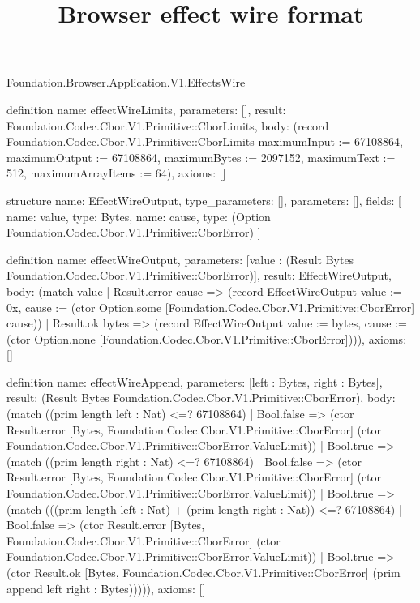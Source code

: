 \begin{lexlean}{Foundation.Browser.Application.V1.EffectsWire}
\title{Browser effect wire format}
\begin{semanticmodule}
definition{
  name: effectWireLimits,
  parameters: [],
  result: Foundation.Codec.Cbor.V1.Primitive::CborLimits,
  body: (record Foundation.Codec.Cbor.V1.Primitive::CborLimits {maximumInput := 67108864, maximumOutput := 67108864, maximumBytes := 2097152, maximumText := 512, maximumArrayItems := 64}),
  axioms: []
}

structure{
  name: EffectWireOutput,
  type_parameters: [],
  parameters: [],
  fields: [
    {name: value, type: Bytes},
    {name: cause, type: (Option Foundation.Codec.Cbor.V1.Primitive::CborError)}
  ]
}

definition{
  name: effectWireOutput,
  parameters: [value : (Result Bytes Foundation.Codec.Cbor.V1.Primitive::CborError)],
  result: EffectWireOutput,
  body: (match value
    | Result.error cause => (record EffectWireOutput {value := 0x, cause := (ctor Option.some [Foundation.Codec.Cbor.V1.Primitive::CborError] cause)})
    | Result.ok bytes => (record EffectWireOutput {value := bytes, cause := (ctor Option.none [Foundation.Codec.Cbor.V1.Primitive::CborError])})),
  axioms: []
}

definition{
  name: effectWireAppend,
  parameters: [left : Bytes, right : Bytes],
  result: (Result Bytes Foundation.Codec.Cbor.V1.Primitive::CborError),
  body: (match ((prim length left : Nat) <=? 67108864)
    | Bool.false => (ctor Result.error [Bytes, Foundation.Codec.Cbor.V1.Primitive::CborError] (ctor Foundation.Codec.Cbor.V1.Primitive::CborError.ValueLimit))
    | Bool.true => (match ((prim length right : Nat) <=? 67108864)
      | Bool.false => (ctor Result.error [Bytes, Foundation.Codec.Cbor.V1.Primitive::CborError] (ctor Foundation.Codec.Cbor.V1.Primitive::CborError.ValueLimit))
      | Bool.true => (match (((prim length left : Nat) + (prim length right : Nat)) <=? 67108864)
        | Bool.false => (ctor Result.error [Bytes, Foundation.Codec.Cbor.V1.Primitive::CborError] (ctor Foundation.Codec.Cbor.V1.Primitive::CborError.ValueLimit))
        | Bool.true => (ctor Result.ok [Bytes, Foundation.Codec.Cbor.V1.Primitive::CborError] (prim append left right : Bytes))))),
  axioms: []
}


\end{semanticmodule}
\end{lexlean}
